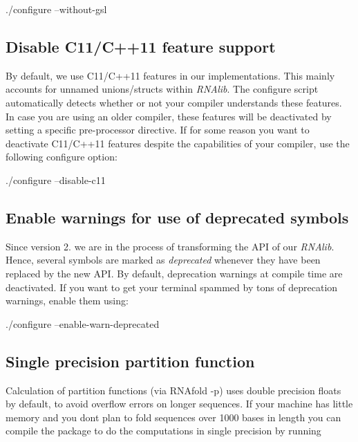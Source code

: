 \begin{DoxyVerb}./configure --without-gsl
\end{DoxyVerb}
\hypertarget{install_config_c11}{}\subsection{Disable C11/\+C++11 feature support}\label{install_config_c11}
By default, we use C11/\+C++11 features in our implementations. This mainly accounts for unnamed unions/structs within {\itshape R\+N\+Alib}. The configure script automatically detects whether or not your compiler understands these features. In case you are using an older compiler, these features will be deactivated by setting a specific pre-\/processor directive. If for some reason you want to deactivate C11/\+C++11 features despite the capabilities of your compiler, use the following configure option\+:

\begin{DoxyVerb}./configure --disable-c11
\end{DoxyVerb}
\hypertarget{install_config_deprecated}{}\subsection{Enable warnings for use of deprecated symbols}\label{install_config_deprecated}
Since version 2. we are in the process of transforming the A\+PI of our {\itshape R\+N\+Alib}. Hence, several symbols are marked as {\itshape deprecated} whenever they have been replaced by the new A\+PI. By default, deprecation warnings at compile time are deactivated. If you want to get your terminal spammed by tons of deprecation warnings, enable them using\+:

\begin{DoxyVerb}./configure --enable-warn-deprecated
\end{DoxyVerb}
\hypertarget{install_config_float_pf}{}\subsection{Single precision partition function}\label{install_config_float_pf}
Calculation of partition functions (via R\+N\+Afold -\/p) uses double precision floats by default, to avoid overflow errors on longer sequences. If your machine has little memory and you don\textquotesingle{}t plan to fold sequences over 1000 bases in length you can compile the package to do the computations in single precision by running

